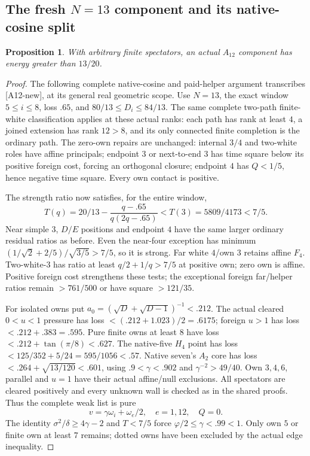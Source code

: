 \documentclass[11pt]{article}
\newtheorem{proposition}[theorem]{Proposition}
\theoremstyle{definition}
\theoremstyle{remark}
\newcommand{\src}[1]{\textnormal{\textsf{[#1]}}}
\begin{document}
\subsection{The fresh \(N=13\) component and its native-cosine split}
\label{app:A12}
\begin{proposition}
With arbitrary finite spectators, an actual \(A_{12}\)
component has energy greater than \(13/20\).
\end{proposition}
\begin{proof}
The following complete native-cosine and paid-helper argument transcribes
\src{A12-new}, at its general real geometric scope.
Use \(N=13\), the exact window \(5\leq i\leq8\),
loss \(.65\), and \(80/13\leq D_i\leq84/13\).
The same complete two-path finite-white classification
applies at these actual ranks: each path has rank
at least \(4\), a joined extension has rank \(12>8\),
and its only connected finite completion is the
ordinary path. The zero-own repairs are unchanged:
internal \(3/4\) and two-white roles have affine
principals; endpoint \(3\) or next-to-end \(3\)
has time square below its positive foreign cost,
forcing an orthogonal closure; endpoint \(4\)
has \(Q<1/5\), hence negative time square.
Every own contact is positive.

The strength ratio now satisfies, for the entire
window,
\[
 T(q)=20/13-\frac{q-.65}{q(2q-.65)}
 <T(3)=5809/4173<7/5.
\]
Near simple \(3\), \(D/E\) positions and endpoint
\(4\) have the same larger ordinary residual ratios
as before. Even the near-four exception has minimum
\((1/\sqrt2+2/5)/\sqrt{3/5}>7/5\), so it is strong.
Far white \(4\)/own \(3\) retains affine \(F_4\).
Two-white-\(3\) has ratio at least
\(q/2+1/q>7/5\) at positive own; zero own is affine.
Positive foreign cost strengthens these tests;
the exceptional foreign far/helper ratios remain
\(>761/500\) or have square \(>121/35\).

For isolated owns put
\(a_0=(\sqrt D+\sqrt{D-1})^{-1}<.212\).
The actual cleared \(0<u<1\) pressure has loss
\(<(.212+1.023)/2=.6175\);
foreign \(u>1\) has loss \(<.212+.383=.595\).
Pure finite owns at least \(8\) have loss
\(<.212+\tan(\pi/8)<.627\).
The native-five \(H_4\) point has loss
\(<125/352+5/24=595/1056<.57\).
Native seven's \(A_2\) core has loss
\(<.264+\sqrt{13/120}<.601\),
using \(.9<\gamma<.902\) and
\(\gamma^{-2}>49/40\).
Own \(3,4,6\), parallel and \(u=1\) have their
actual affine/null exclusions.
All spectators are cleared positively and every
unknown wall is checked as in the shared proofs.
Thus the complete weak list is pure
\[
 v=\gamma\omega_i+\omega_e/2,\quad e=1,12,\quad Q=0.
\]
The identity \(\sigma^2/\delta\geq4\gamma-2\)
and \(T<7/5\) force
\(\varphi/2\leq\gamma<.99<1\).
Only own \(5\) or finite own at least \(7\)
remains; dotted owns have been excluded by the
actual edge inequality.


\end{proof}
\end{document}
